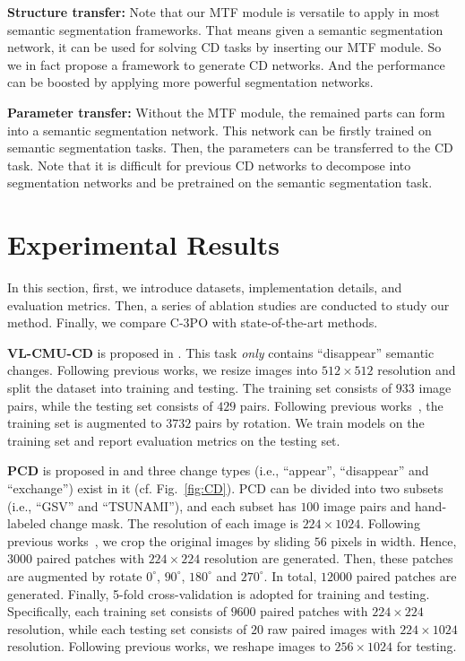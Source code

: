 \documentclass[review]{elsarticle}
\begin{document}
\textbf{Structure transfer:} Note that our MTF module is versatile to apply in most semantic segmentation frameworks. That means given a semantic segmentation network, it can be used for solving CD tasks by inserting our MTF module. So we in fact propose a framework to generate CD networks. And the performance can be boosted by applying more powerful segmentation networks.

\textbf{Parameter transfer:} Without the MTF module, the remained parts can form into a semantic segmentation network. This network can be firstly trained on semantic segmentation tasks. Then, the parameters can be transferred to the CD task. Note that it is difficult for previous CD networks to decompose into segmentation networks and be pretrained on the semantic segmentation task.

\section{Experimental Results}

In this section, first, we introduce datasets, implementation details, and evaluation metrics. Then, a series of ablation studies are conducted to study our method. Finally, we compare C-3PO with state-of-the-art methods.

\textbf{VL-CMU-CD} is proposed in \cite{VL_CMU_CD}. This task \emph{only} contains ``disappear'' semantic changes. Following previous works, we resize images into $512\times 512$ resolution and split the dataset into training and testing. The training set consists of $933$ image pairs, while the testing set consists of $429$ pairs. Following previous works~\cite{CSCDNet,DR_TANet,FC_EF,ChangeNet}, the training set is augmented to $3732$ pairs by rotation. We train models on the training set and report evaluation metrics on the testing set.

\textbf{PCD} is proposed in \cite{PCD} and three change types (i.e., ``appear'', ``disappear'' and ``exchange'') exist in it (cf. Fig.~\ref{fig:CD}). PCD can be divided into two subsets (i.e., ``GSV'' and ``TSUNAMI''), and each subset has $100$ image pairs and hand-labeled change mask. The resolution of each image is $224\times 1024$. Following previous works~\cite{DR_TANet,HPCFNet}, we crop the original images by sliding $56$ pixels in width. Hence, $3000$ paired patches with $224\times 224$ resolution are generated. Then, these patches are augmented by rotate $0^{\circ}$, $90^{\circ}$, $180^{\circ}$ and $270^{\circ}$. In total, $12000$ paired patches are generated. Finally, 5-fold cross-validation is adopted for training and testing. Specifically, each training set consists of $9600$ paired patches with $224\times 224$ resolution, while each testing set consists of $20$ raw paired images with $224\times 1024$ resolution. Following previous works, we reshape images to $256\times 1024$ for testing. 
\end{document}
